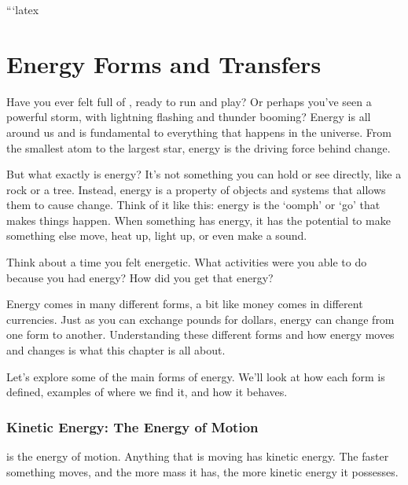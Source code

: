 ```latex
\chapter{Energy Forms and Transfers}

\FloatBarrier

Have you ever felt full of , ready to run and play? Or perhaps you’ve seen a powerful storm, with lightning flashing and thunder booming? Energy is all around us and is fundamental to everything that happens in the universe.  From the smallest atom to the largest star, energy is the driving force behind change.


But what exactly is energy?  It's not something you can hold or see directly, like a rock or a tree. Instead, energy is a property of objects and systems that allows them to cause change.  Think of it like this: energy is the ‘oomph’ or ‘go’ that makes things happen.  When something has energy, it has the potential to make something else move, heat up, light up, or even make a sound.

\begin{stopandthink}
Think about a time you felt energetic. What activities were you able to do because you had energy? How did you get that energy?
\end{stopandthink}

Energy comes in many different forms, a bit like money comes in different currencies.  Just as you can exchange pounds for dollars, energy can change from one form to another.  Understanding these different forms and how energy moves and changes is what this chapter is all about.

\FloatBarrier

Let's explore some of the main forms of energy. We'll look at how each form is defined, examples of where we find it, and how it behaves.

\subsection{Kinetic Energy: The Energy of Motion}

 is the energy of motion.  Anything that is moving has kinetic energy. The faster something moves, and the more mass it has, the more kinetic energy it possesses.


